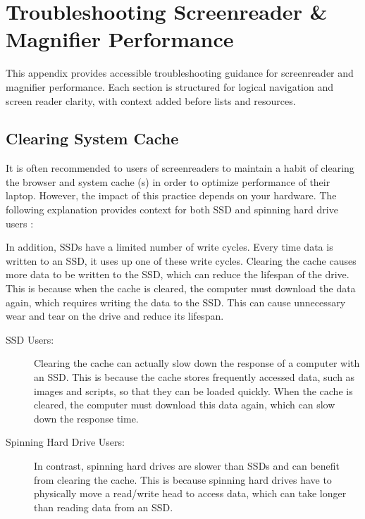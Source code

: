 \chapter{Troubleshooting Screenreader \& Magnifier Performance}
\label{app1:troubleshooting}

\begin{raggedright}
	This appendix provides accessible troubleshooting guidance for screenreader and magnifier performance. Each section is structured for logical navigation and screen reader clarity, with context added before lists and resources.
\end{raggedright}

\section{Clearing System Cache}
\label{app1:cache}
It is often recommended to users of screenreaders to maintain a habit of clearing the browser and system cache (s) in order to optimize performance of their laptop. However, the impact of this practice depends on your hardware. The following explanation provides context for both SSD and spinning hard drive users \cite{SystemOptimizationGuides, Microsoft2023WindowsPerformance}:

In addition, SSDs have a limited number of write cycles. Every time data is written to an SSD, it uses up one of these write cycles. Clearing the cache causes more data to be written to the SSD, which can reduce the lifespan of the drive. This is because when the cache is cleared, the computer must download the data again, which requires writing the data to the SSD. This can cause unnecessary wear and tear on the drive and reduce its lifespan.

\begin{description}
	\item[SSD Users:] Clearing the cache can actually slow down the response of a computer with an SSD. This is because the cache stores frequently accessed data, such as images and scripts, so that they can be loaded quickly. When the cache is cleared, the computer must download this data again, which can slow down the response time.
	\item[Spinning Hard Drive Users:] In contrast, spinning hard drives are slower than SSDs and can benefit from clearing the cache. This is because spinning hard drives have to physically move a read/write head to access data, which can take longer than reading data from an SSD.
\end{description}

